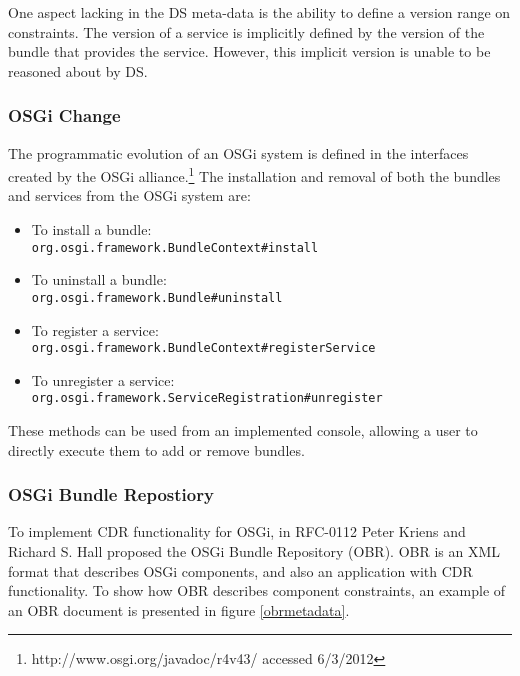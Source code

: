 One aspect lacking in the DS meta-data is the ability to define a version range on constraints.
The version of a service is implicitly defined by the version of the bundle that provides the service.
However, this implicit version is unable to be reasoned about by DS.

\subsubsection{OSGi Change}
The programmatic evolution of an OSGi system is defined in the interfaces created by the OSGi alliance.\footnote{http://www.osgi.org/javadoc/r4v43/ accessed 6/3/2012}
The installation and removal of both the bundles and services from the OSGi system are:
 
\begin{itemize}
  \item To install a bundle:\\ \texttt{org.osgi.framework.BundleContext}\verb+#+\texttt{install}
  \item To uninstall a bundle:\\ \texttt{org.osgi.framework.Bundle}\verb+#+\texttt{uninstall}
  \item To register a service: \\ \texttt{org.osgi.framework.BundleContext}\verb+#+\texttt{registerService}
  \item To unregister a service: \\ \texttt{org.osgi.framework.ServiceRegistration}\verb+#+\texttt{unregister}
\end{itemize}

These methods can be used from an implemented console, allowing a user to directly execute them to add or remove bundles.

\subsubsection{OSGi Bundle Repostiory}
To implement CDR functionality for OSGi,
in RFC-0112 \citep{the_osgi_alliance_rfc-0112_2006} Peter Kriens and Richard S. Hall  proposed the OSGi Bundle Repository (OBR).
OBR is an XML format that describes OSGi components, and also an application with CDR functionality.
To show how OBR describes component constraints, an example of an OBR document is presented in figure \ref{obrmetadata}.

